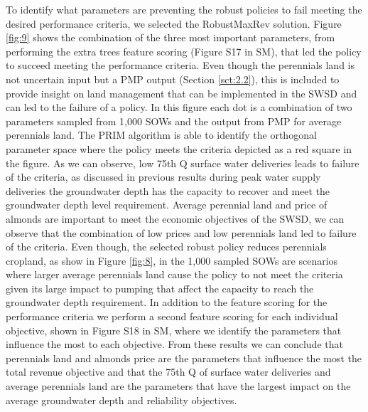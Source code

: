 \documentclass[a4paper,fleqn]{cas-sc}
\begin{document}
To identify what parameters are preventing the robust policies to fail meeting the desired performance criteria, we selected the RobustMaxRev solution. Figure \ref{fig:9} shows the combination of the three most important parameters, from performing the extra trees feature scoring (Figure S17 in SM), that led the policy to succeed meeting the performance criteria. Even though the perennials land is not uncertain input but a PMP output (Section \ref{sct:2.2}), this is included to provide insight on land management that can be implemented in the SWSD and can led to the failure of a policy. In this figure each dot is a combination of two parameters sampled from 1,000 SOWs and the output from PMP for average perennials land. The PRIM algorithm is able to identify the orthogonal parameter space where the policy meets the criteria depicted as a red square in the figure. As we can observe, low 75th Q surface water deliveries leads to failure of the criteria, as discussed in previous results during peak water supply deliveries the groundwater depth has the capacity to recover and meet the groundwater depth level requirement. Average perennial land and price of almonds are important to meet the economic objectives of the SWSD, we can observe that the combination of low prices and low perennials land led to failure of the criteria. Even though, the selected robust policy reduces perennials cropland, as show in Figure \ref{fig:8}, in the 1,000 sampled SOWs are scenarios where larger average perennials land cause the policy to not meet the criteria given its large impact to pumping that affect the capacity to reach the groundwater depth requirement. In addition to the feature scoring for the performance criteria we perform a second feature scoring for each individual objective, shown in Figure S18 in SM, where we identify the parameters that influence the most to each objective. From these results we can conclude that perennials land and almonds price are the parameters that influence the most the total revenue objective and that the 75th Q of surface water deliveries and average perennials land are the parameters that have the largest impact on the average groundwater depth  and reliability objectives.
\end{document}
